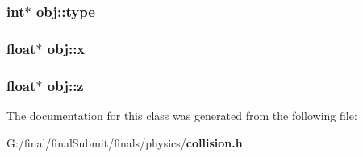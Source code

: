 \subsubsection[{type}]{\setlength{\rightskip}{0pt plus 5cm}int$\ast$ obj\-::type}\label{classobj_ac9dfc54a1d493fd269b40b3dadf7dfed}
\subsubsection[{x}]{\setlength{\rightskip}{0pt plus 5cm}float$\ast$ obj\-::x}\label{classobj_ab9e09580ccca6e79df1e7f58d61b57c8}
\subsubsection[{z}]{\setlength{\rightskip}{0pt plus 5cm}float$\ast$ obj\-::z}\label{classobj_aef88ca2ac37e64c2444cc85337030537}


The documentation for this class was generated from the following file\-:\begin{DoxyCompactItemize}
\item 
G\-:/final/final\-Submit/finals/physics/{\bf collision.\-h}\end{DoxyCompactItemize}
